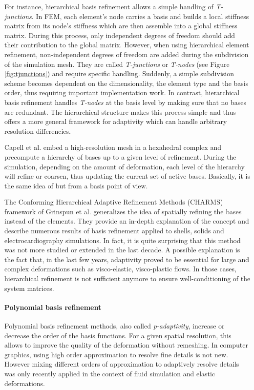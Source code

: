 For instance, hierarchical basis refinement allows a simple handling of \emph{T-junctions}.
In FEM, each element's node carries a basis and builds a local stiffness matrix from its node's stiffness which are then assemble into a global stiffness matrix.
During this process, only independent degrees of freedom should add their contribution to the global matrix. However, when using hierarchical element refinement, non-independent degrees of freedom are added during the subdivision of the simulation mesh. They are called \emph{T-junctions} or \emph{T-nodes} (see Figure \ref{fig:tjunctions}) and require specific handling. Suddenly, a simple subdivision scheme becomes dependent on the dimensionality, the element type and the basis order, thus requiring important implementation work. In contrast, hierarchical basis refinement handles \emph{T-nodes} at the basis level by making sure that no bases are redundant. The hierarchical structure makes this process simple and thus offers a more general framework for adaptivity which can handle arbitrary resolution differencies.

Capell et al. \cite{Capell2002} embed a high-resolution mesh in a hexahedral complex and precompute a hierarchy of bases up to a given level of refinement. During the simulation, depending on the amount of deformation, each level of the hierarchy will refine or coarsen, thus updating the current set of active bases. Basically, it is the same idea of \cite{Debunne2001} but from a basis point of view.

The Conforming Hierarchical Adaptive Refinement Methods (CHARMS) framework of Grinspun et al. \cite{Grinspun2002} generalizes the idea of spatially refining the bases instead of the elements. They provide an in-depth explanation of the concept and describe numerous results of basis refinement applied to shells, solids and electrocardiography simulations.
In fact, it is quite surprising that this method was not more studied or extended in the last decade. A possible explanation is the fact that, in the last few years, adaptivity proved to be essential for large and complex deformations such as visco-elastic, visco-plastic flows. In those cases, hierarchical refinement is not sufficient anymore to ensure well-conditioning of the system matrices. 

\paragraph*{Polynomial basis refinement}
Polynomial basis refinement methods, also called \emph{p-adaptivity}, increase or decrease the order of the basis functions.
For a given spatial resolution, this allows to improve the quality of the deformation without remeshing. In computer graphics, using high order approximation to resolve fine details is not new. However mixing different orders of approximation to adaptively resolve details was only recently applied in the context of fluid simulation and elastic deformations.

